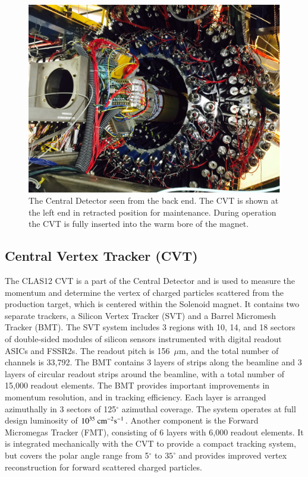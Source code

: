\documentclass[final,3p,twocolumn]{elsarticle}
\begin{document}
\begin{figure}[htbp!]
\centerline{\includegraphics[width=1.0\columnwidth]{CLAS12-CD.png}}
\caption{The Central Detector seen from the back end. The CVT is shown at the left end in retracted position for
maintenance. During operation the CVT is  fully inserted into the warm bore of the magnet.}
\label{CDback}
\end{figure}

\subsection{Central Vertex Tracker (CVT)}

The CLAS12 CVT is a part of the Central Detector and is used to measure the momentum and determine the vertex of
charged particles scattered from the production target, which is centered within the Solenoid magnet. It contains two
separate trackers, a Silicon Vertex Tracker (SVT) and a Barrel Micromesh Tracker  (BMT). The SVT system includes 3
regions with 10, 14, and 18 sectors of double-sided modules of silicon sensors instrumented with digital readout ASICs and
FSSR2s. The readout pitch is 156~$\mu$m, and the total number of channels is 33,792. The BMT contains 3 layers of
strips along the beamline and 3 layers of circular readout strips around the beamline, with a total number of 15,000 readout
elements. The BMT provides important improvements in momentum resolution, and in tracking efficiency. Each layer is
arranged azimuthally in 3 sectors of 125$^\circ$ azimuthal coverage. The system operates at full design luminosity of
$10^{35}\rm~{cm^{-2}s^{-1}}$. Another component is the Forward Micromegas Tracker (FMT), consisting of 6 layers with
6,000 readout elements. It  is integrated mechanically with the CVT to provide a compact tracking system, but covers the
polar angle range from 5$^\circ$ to $35^\circ$ and provides improved vertex reconstruction for forward scattered charged
particles.
\end{document}
